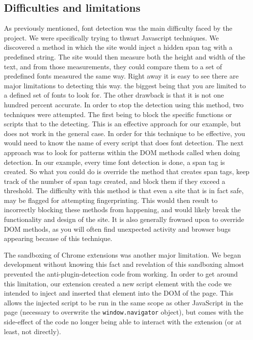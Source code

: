\documentclass[12pt,a4paper]{article}
\begin{document}
\subsection{Difficulties and limitations}
As previously mentioned, font detection was the main difficulty faced by the project. We were specifically trying to thwart Javascript techniques. We discovered a method\cite{fontdetection} in which the site would inject a hidden span tag with a predefined string. The site would then measure both the height and width of the text, and from those measurements, they could compare them to a set of predefined fonts measured the same way. Right away it is easy to see there are major limitations to detecting this way. the biggest being that you are limited to a defined set of fonts to look for. The other drawback is that it is not one hundred percent accurate. In order to stop the detection using this method, two techniques were attempted. The first being to block the specific functions or scripts that to the detecting. This is an effective approach for our example, but does not work in the general case. In order for this technique to be effective, you would need to know the name of every script that does font detection. The next approach was to look for patterns within the DOM methods called when doing detection. In our example, every time font detection is done, a span tag is created. So what you could do is override the method that creates span tags, keep track of the number of span tags created, and block them if they exceed a threshold. The difficulty with this method is that even a site that is in fact safe, may be flagged for attempting fingerprinting. This would then result to incorrectly blocking these methods from happening, and would likely break the functionality and design of the site. It is also generally frowned upon to override DOM methods, as you will often find unexpected activity and browser bugs appearing because of this technique.    

The sandboxing of Chrome extensions was another major limitation. We began development without knowing this fact and revelation of this sandboxing almost prevented the anti-plugin-detection code from working. In order to get around this limitation, our extension created a new script element with the code we intended to inject and inserted that element into the DOM of the page. This allows the injected script to be run in the same scope as other JavaScript in the page (necessary to overwrite the \texttt{window.navigator} object), but comes with the side-effect of the code no longer being able to interact with the extension (or at least, not directly).
\end{document}
